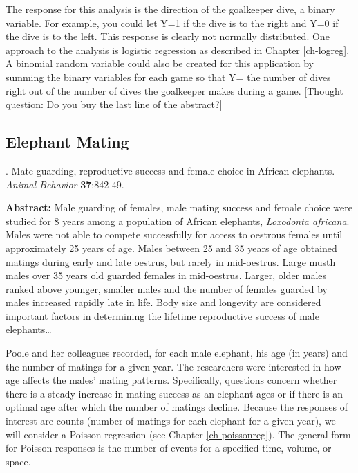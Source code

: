 \documentclass[
]{krantz}
\renewenvironment{quote}{\begin{VF}}{\end{VF}}
\begin{document}
The response for this analysis is the direction of the goalkeeper dive, a binary variable. For example, you could let Y=1 if the dive is to the right and Y=0 if the dive is to the left. This response is clearly not normally distributed. One approach to the analysis is logistic regression as described in Chapter \ref{ch-logreg}. A binomial random variable could also be created for this application by summing the binary variables for each game so that Y= the number of dives right out of the number of dives the goalkeeper makes during a game. {[}Thought question: Do you buy the last line of the abstract?{]}

\hypertarget{elephant-mating}{%
\subsection{Elephant Mating}\label{elephant-mating}}

\citet{Poole1989} . Mate guarding, reproductive success and female choice in African elephants. \emph{Animal Behavior} \textbf{37}:842-49.

\begin{quote}
\textbf{Abstract:} Male guarding of females, male mating success and female choice were studied for 8 years among a population of African elephants, \emph{Loxodonta africana}. Males were not able to compete successfully for access to oestrous females until approximately 25 years of age. Males between 25 and 35 years of age obtained matings during early and late oestrus, but rarely in mid-oestrus. Large musth males over 35 years old guarded females in mid-oestrus. Larger, older males ranked above younger, smaller males and the number of females guarded by males increased rapidly late in life. Body size and longevity are considered important factors in determining the lifetime reproductive success of male elephants\ldots{}
\end{quote}

Poole and her colleagues recorded, for each male elephant, his age (in years) and the number of matings for a given year. The researchers were interested in how age affects the males' mating patterns. Specifically, questions concern whether there is a steady increase in mating success as an elephant ages or if there is an optimal age after which the number of matings decline. Because the responses of interest are counts (number of matings for each elephant for a given year), we will consider a Poisson regression (see Chapter \ref{ch-poissonreg}). The general form for Poisson responses is the number of events for a specified time, volume, or space.
\end{document}
